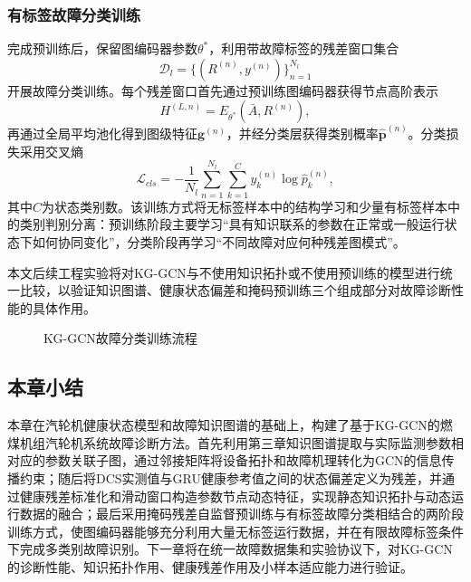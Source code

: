 \subsubsection{有标签故障分类训练}

完成预训练后，保留图编码器参数$\theta^*$，利用带故障标签的残差窗口集合
\begin{equation}
    \mathcal D_l=\{(R^{(n)},y^{(n)})\}_{n=1}^{N_l}
\end{equation}
开展故障分类训练。每个残差窗口首先通过预训练图编码器获得节点高阶表示
\begin{equation}
    H^{(L,n)}=E_{\theta^*}(\bar A,R^{(n)}),
\end{equation}
再通过全局平均池化得到图级特征$\mathbf g^{(n)}$，并经分类层获得类别概率$\hat{\mathbf p}^{(n)}$。分类损失采用交叉熵
\begin{equation}
    \mathcal L_{cls}=-\frac{1}{N_l}\sum_{n=1}^{N_l}\sum_{k=1}^{C}
    y_k^{(n)}\log \hat p_k^{(n)},
\end{equation}
其中$C$为状态类别数。该训练方式将无标签样本中的结构学习和少量有标签样本中的类别判别分离：预训练阶段主要学习“具有知识联系的参数在正常或一般运行状态下如何协同变化”，分类阶段再学习“不同故障对应何种残差图模式”。

本文后续工程实验将对KG-GCN与不使用知识拓扑或不使用预训练的模型进行统一比较，以验证知识图谱、健康状态偏差和掩码预训练三个组成部分对故障诊断性能的具体作用。

\begin{figure}[htbp]
    \centering
    \caption{KG-GCN故障分类训练流程}
    \label{fig:kg_gcn_classification_v2}
\end{figure}

\subsection{本章小结}

本章在汽轮机健康状态模型和故障知识图谱的基础上，构建了基于KG-GCN的燃煤机组汽轮机系统故障诊断方法。首先利用第三章知识图谱提取与实际监测参数相对应的参数关联子图，通过邻接矩阵将设备拓扑和故障机理转化为GCN的信息传播约束；随后将DCS实测值与GRU健康参考值之间的状态偏差定义为残差，并通过健康残差标准化和滑动窗口构造参数节点动态特征，实现静态知识拓扑与动态运行数据的融合；最后采用掩码残差自监督预训练与有标签故障分类相结合的两阶段训练方式，使图编码器能够充分利用大量无标签运行数据，并在有限故障标签条件下完成多类别故障识别。下一章将在统一故障数据集和实验协议下，对KG-GCN的诊断性能、知识拓扑作用、健康残差作用及小样本适应能力进行验证。
